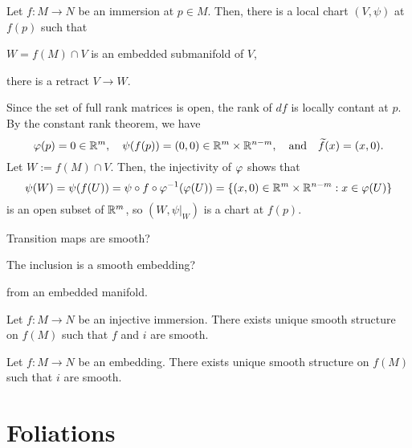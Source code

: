 \documentclass{../../large}
\begin{document}
\begin{prb}
Let $f:M\to N$ be an immersion at $p\in M$.
Then, there is a local chart $(V,\psi)$ at $f(p)$ such that
\begin{parts}
\item $W=f(M)\cap V$ is an embedded submanifold of $V$,
\item there is a retract $V\to W$.
\end{parts}
\end{prb}
\begin{pf}
Since the set of full rank matrices is open, the rank of $df$ is locally contant at $p$.
By the constant rank theorem, we have
\[\varphi(p)=0\in\mathbb{R}^m,\quad\psi(f(p))=(0,0)\in\mathbb{R}^m\times\mathbb{R}^{n-m},\quad\text{and}\quad\widetilde f(x)=(x,0).\]
Let $W:=f(M)\cap V$.
Then, the injectivity of $\varphi$ shows that
\[\psi(W)=\psi(f(U))=\psi\circ f\circ\varphi^{-1}(\varphi(U))=\{(x,0)\in\mathbb{R}^m\times\mathbb{R}^{n-m}:x\in\varphi(U)\}\]
is an open subset of $\mathbb{R}^m$, so $(W,\psi|_W)$ is a chart at $f(p)$.

Transition maps are smooth?

The inclusion is a smooth embedding?
\end{pf}

\begin{prb}
from an embedded manifold.
\end{prb}


Let $f:M\to N$ be an injective immersion.
There exists unique smooth structure on $f(M)$ such that $f$ and $i$ are smooth.

Let $f:M\to N$ be an embedding.
There exists unique smooth structure on $f(M)$ such that $i$ are smooth.






\section{Foliations}
\begin{prb}[Foliation]
\end{prb}
\end{document}
